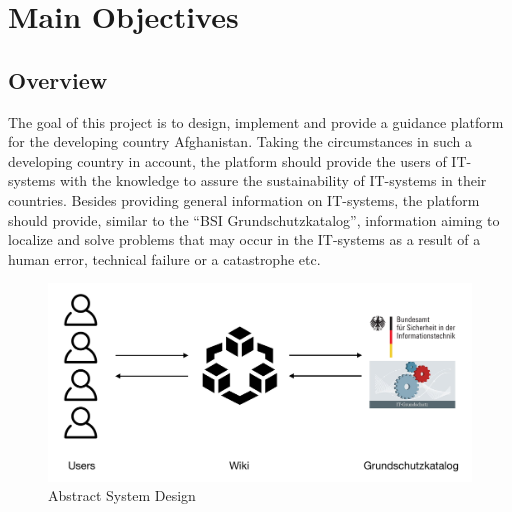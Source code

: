 \chapter{Main Objectives}

\section{Overview} 
The goal of this project is to design, implement and provide a guidance platform for the developing country Afghanistan. 
Taking the circumstances in such a developing country in account, the platform should provide the users of IT-systems with the knowledge to assure the sustainability of IT-systems in their countries. 
Besides providing general information on IT-systems, the platform should provide, similar to the “BSI Grundschutzkatalog”, information aiming to localize and solve problems that may occur in the IT-systems as a result of a human error, technical failure or a catastrophe etc. 
\\
\begin{figure}[h] 
    \centering
    \includegraphics[scale=0.3]{Pictures/ConceptSketch}
    \caption{Abstract System Design}
\end{figure} 


